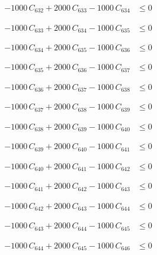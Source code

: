 \documentclass[a4paper,11pt]{article}
\begin{document}
\begin{align}
-1000\,C_{632} + 2000\,C_{633} - 1000\,C_{634} &\leq 0 \nonumber
\end{align}

\begin{align}
-1000\,C_{633} + 2000\,C_{634} - 1000\,C_{635} &\leq 0 \nonumber
\end{align}

\begin{align}
-1000\,C_{634} + 2000\,C_{635} - 1000\,C_{636} &\leq 0 \nonumber
\end{align}

\begin{align}
-1000\,C_{635} + 2000\,C_{636} - 1000\,C_{637} &\leq 0 \nonumber
\end{align}

\begin{align}
-1000\,C_{636} + 2000\,C_{637} - 1000\,C_{638} &\leq 0 \nonumber
\end{align}

\begin{align}
-1000\,C_{637} + 2000\,C_{638} - 1000\,C_{639} &\leq 0 \nonumber
\end{align}

\begin{align}
-1000\,C_{638} + 2000\,C_{639} - 1000\,C_{640} &\leq 0 \nonumber
\end{align}

\begin{align}
-1000\,C_{639} + 2000\,C_{640} - 1000\,C_{641} &\leq 0 \nonumber
\end{align}

\begin{align}
-1000\,C_{640} + 2000\,C_{641} - 1000\,C_{642} &\leq 0 \nonumber
\end{align}

\begin{align}
-1000\,C_{641} + 2000\,C_{642} - 1000\,C_{643} &\leq 0 \nonumber
\end{align}

\begin{align}
-1000\,C_{642} + 2000\,C_{643} - 1000\,C_{644} &\leq 0 \nonumber
\end{align}

\begin{align}
-1000\,C_{643} + 2000\,C_{644} - 1000\,C_{645} &\leq 0 \nonumber
\end{align}

\begin{align}
-1000\,C_{644} + 2000\,C_{645} - 1000\,C_{646} &\leq 0 \nonumber
\end{align}
\end{document}
